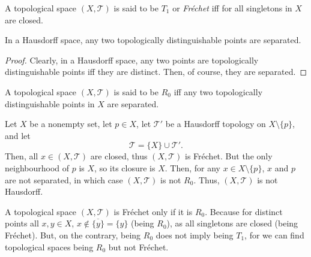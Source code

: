 

\begin{definition}
	\label{def: T_1 spaces}
	A topological space $(X, \mathcal T)$ is said to be $T_1$ or \textit{Fr\'echet} iff for all singletons in $X$ are closed.
\end{definition}


\begin{proposition}
	\label{prop: T2 implies R0}
	In a Hausdorff space, any two topologically distinguishable points are separated.
	
	\begin{proof}
		Clearly, in a Hausdorff space, any two points are topologically distinguishable points iff they are distinct. Then, of course, they are separated.
	\end{proof}
\end{proposition}


\begin{definition}
	[$R_0$ spaces]
	\label{def: R_0 spaces}
	A topological space $(X, \mathcal T)$ is said to be $R_0$ iff any two topologically distinguishable points in $X$ are separated.
\end{definition}


\begin{example}
	\label{eg: T_1 but not T_2}
	Let $X$ be a nonempty set, let $p \in X$, let $\mathcal T'$ be a Hausdorff topology on $X \setminus \{p\}$, and let
	$$
	\mathcal T = \{X\} \cup \mathcal T'.
	$$
	Then, all $x \in (X, \mathcal T)$ are closed, thus $(X, \mathcal T)$ is Fr\'echet. But the only neighbourhood of $p$ is $X$, so its closure is $X$. Then, for any $x \in X \setminus \{p\}$, $x$ and $p$ are not separated, in which case $(X, \mathcal T)$ is not $R_0$. Thus, $(X, \mathcal T)$ is not Hausdorff.
\end{example}


\begin{note}
	A topological space $(X, \mathcal T)$ is Fr\'echet only if it is $R_0$. Because for distinct points all $x,y \in X$, $x \notin \overline{\{y\}} = \{y\}$ (being $R_0$), as all singletons are closed (being Fr\'echet). But, on the contrary, being $R_0$ does not imply being $T_1$, for we can find topological spaces being $R_0$ but not Fr\'echet.
\end{note}



